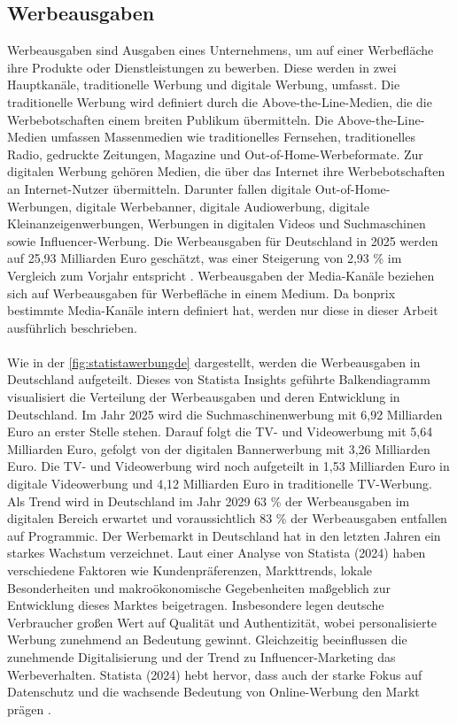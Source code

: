 \subsection{Werbeausgaben}
\label{werbeausgaben}
Werbeausgaben sind Ausgaben eines Unternehmens, um auf einer Werbefläche ihre Produkte oder Dienstleistungen zu bewerben. Diese werden in zwei Hauptkanäle, traditionelle Werbung und digitale Werbung, umfasst. Die traditionelle Werbung wird definiert durch die Above-the-Line-Medien, die die Werbebotschaften einem breiten Publikum übermitteln. Die Above-the-Line-Medien umfassen Massenmedien wie traditionelles Fernsehen, traditionelles Radio, gedruckte Zeitungen, Magazine und Out-of-Home-Werbeformate. Zur digitalen Werbung gehören Medien, die über das Internet ihre Werbebotschaften an Internet-Nutzer übermitteln. Darunter fallen digitale Out-of-Home-Werbungen, digitale Werbebanner, digitale Audiowerbung, digitale Kleinanzeigenwerbungen, Werbungen in digitalen Videos und Suchmaschinen sowie Influencer-Werbung. Die Werbeausgaben für Deutschland in 2025 werden auf 25,93 Milliarden Euro geschätzt, was einer Steigerung von 2,93 \% im Vergleich zum Vorjahr entspricht \cite{statista_werbung}. Werbeausgaben der Media-Kanäle beziehen sich auf Werbeausgaben für Werbefläche in einem Medium. Da bonprix bestimmte Media-Kanäle intern definiert hat, werden nur diese in dieser Arbeit ausführlich beschrieben. \\\\ 
Wie in der \autoref{fig:statistawerbungde} dargestellt, werden die Werbeausgaben in Deutschland aufgeteilt. Dieses von Statista Insights geführte Balkendiagramm visualisiert die Verteilung der Werbeausgaben und deren Entwicklung in Deutschland. Im Jahr 2025 wird die Suchmaschinenwerbung mit 6,92 Milliarden Euro an erster Stelle stehen. Darauf folgt die TV- und Videowerbung mit 5,64 Milliarden Euro, gefolgt von der digitalen Bannerwerbung mit 3,26 Milliarden Euro. Die TV- und Videowerbung wird noch aufgeteilt in 1,53 Milliarden Euro in digitale Videowerbung und 4,12 Milliarden Euro in traditionelle TV-Werbung. Als Trend wird in Deutschland im Jahr 2029 63 \% der Werbeausgaben im digitalen Bereich erwartet und voraussichtlich 83 \% der Werbeausgaben entfallen auf Programmic. Der Werbemarkt in Deutschland hat in den letzten Jahren ein starkes Wachstum verzeichnet. Laut einer Analyse von Statista (2024) haben verschiedene Faktoren wie Kundenpräferenzen, Markttrends, lokale Besonderheiten und makroökonomische Gegebenheiten maßgeblich zur Entwicklung dieses Marktes beigetragen. Insbesondere legen deutsche Verbraucher großen Wert auf Qualität und Authentizität, wobei personalisierte Werbung zunehmend an Bedeutung gewinnt. Gleichzeitig beeinflussen die zunehmende Digitalisierung und der Trend zu Influencer-Marketing das Werbeverhalten. Statista (2024) hebt hervor, dass auch der starke Fokus auf Datenschutz und die wachsende Bedeutung von Online-Werbung den Markt prägen \cite{statista_werbung}.
